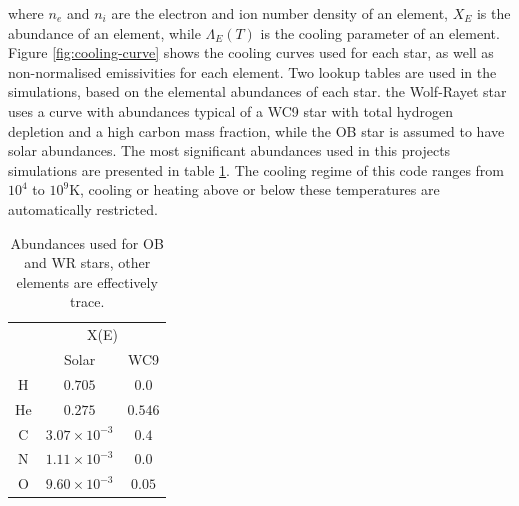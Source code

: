 where $n_e$ and $n_i$ are the electron and ion number density of an element, $X_E$ is the abundance of an element, while $\Lambda_E(T)$ is the cooling parameter of an element.
Figure \ref{fig:cooling-curve} shows the cooling curves used for each star, as well as non-normalised emissivities for each element.
Two lookup tables are used in the simulations, based on the elemental abundances of each star. the Wolf-Rayet star uses a curve with abundances typical of a WC9 star with total hydrogen depletion and a high carbon mass fraction, while the OB star is assumed to have solar abundances.
The most significant abundances used in this projects simulations are presented in table \ref{tab:abundances}.
The cooling regime of this code ranges from $10^4$ to $10^9 \si{\kelvin}$, cooling or heating above or below these temperatures are automatically restricted.

\begin{table}
  \centering
  \begin{tabular}{@{}ccc@{}}
  \toprule
  \multicolumn{1}{l}{} & \multicolumn{2}{c}{X(E)} \\ \cmidrule(l){2-3} 
   & Solar & WC9 \\ \midrule
  H & $0.705$ & $0.0$ \\
  He & $0.275$ & $0.546$ \\
  C & $3.07 \times 10^{-3}$ & $0.4$ \\
  N & $1.11 \times 10^{-3}$ & $0.0$ \\
  O & $9.60 \times 10^{-3}$ & $0.05$ \\
  \end{tabular}
  \caption[Abundances used for OB and WR stars]{Abundances used for OB and WR stars, other elements are effectively trace.}
  \label{tab:abundances}
\end{table}


